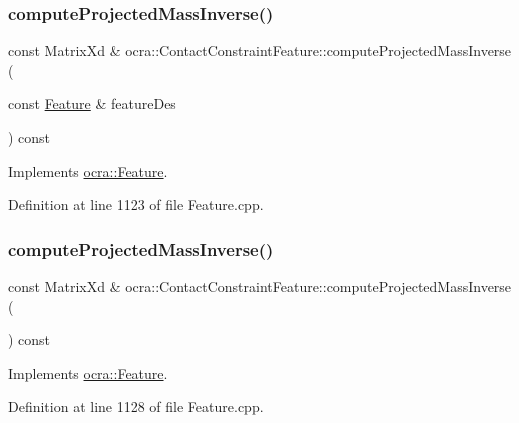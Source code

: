 \subsubsection{\texorpdfstring{compute\+Projected\+Mass\+Inverse()}{computeProjectedMassInverse()}\hspace{0.1cm}{\footnotesize\ttfamily [1/2]}}
{\footnotesize\ttfamily const Matrix\+Xd \& ocra\+::\+Contact\+Constraint\+Feature\+::compute\+Projected\+Mass\+Inverse (\begin{DoxyParamCaption}\item[{const \hyperlink{classocra_1_1Feature}{Feature} \&}]{feature\+Des }\end{DoxyParamCaption}) const\hspace{0.3cm}{\ttfamily [virtual]}}



Implements \hyperlink{classocra_1_1Feature_ac529096b3fe8eba1ab88a56d8b042d37}{ocra\+::\+Feature}.



Definition at line 1123 of file Feature.\+cpp.

\hypertarget{classocra_1_1ContactConstraintFeature_a78ba3452b7ad08dae7a266b0334aaa5d}{}\label{classocra_1_1ContactConstraintFeature_a78ba3452b7ad08dae7a266b0334aaa5d} 
\subsubsection{\texorpdfstring{compute\+Projected\+Mass\+Inverse()}{computeProjectedMassInverse()}\hspace{0.1cm}{\footnotesize\ttfamily [2/2]}}
{\footnotesize\ttfamily const Matrix\+Xd \& ocra\+::\+Contact\+Constraint\+Feature\+::compute\+Projected\+Mass\+Inverse (\begin{DoxyParamCaption}{ }\end{DoxyParamCaption}) const\hspace{0.3cm}{\ttfamily [virtual]}}



Implements \hyperlink{classocra_1_1Feature_ac27bcbdbb8541e3b4e2c77a6d6f2ffc0}{ocra\+::\+Feature}.



Definition at line 1128 of file Feature.\+cpp.

